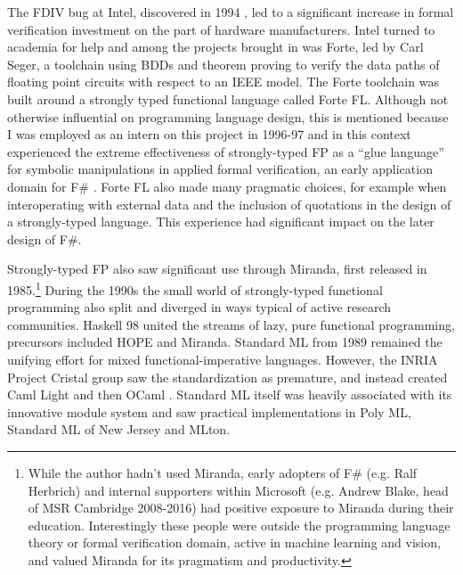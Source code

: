 \documentclass[acmsmall]{acmart}\settopmatter{}
\begin{document}
The FDIV bug at Intel, discovered in 1994 \citep{FDIV}, led to a
significant increase in formal verification investment on the part of hardware manufacturers. Intel turned to academia for help and among the projects brought
in was Forte, led by Carl Seger, a toolchain using BDDs and theorem proving to verify the data paths of floating point circuits with respect to an IEEE model.
The Forte toolchain was built around a strongly typed functional language called Forte FL. Although not otherwise influential on programming language design, this
is mentioned because I was employed as an intern on this project in 1996-97 and in this context experienced the extreme effectiveness of strongly-typed FP
as a “glue language” for symbolic manipulations in applied formal verification, an early application domain for F\# \citep{Seger2005}. Forte FL also made
many pragmatic choices, for example when interoperating with external data and the inclusion of quotations in the design of a strongly-typed language. This experience
had significant impact on the later design of F\#.

Strongly-typed FP also saw significant use through Miranda, first released in 1985.\footnote{While the author hadn’t used Miranda, early adopters of
F\# (e.g. Ralf Herbrich) and internal supporters within Microsoft (e.g. Andrew Blake, head of MSR Cambridge 2008-2016) had positive exposure to Miranda
during their education. Interestingly these people were outside the programming language theory or formal verification domain, active in machine learning and vision, and
valued Miranda for its pragmatism and productivity.}  During the 1990s the small world of strongly-typed functional programming also split and diverged in ways typical
of active research communities.  Haskell 98 united the streams of lazy, pure functional programming, precursors included HOPE and Miranda.  Standard ML from 1989 remained
the unifying effort for mixed functional-imperative languages. However, the INRIA Project Cristal group saw the standardization as premature, and instead created
Caml Light and then OCaml \citep{Leroy2014}. Standard ML itself was heavily associated with its innovative module system and saw practical implementations in Poly ML, Standard
ML of New Jersey and MLton.
\end{document}
